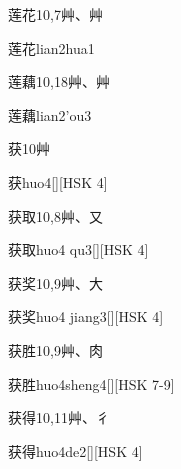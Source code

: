 \begin{Entry}{莲花}{10,7}{⾋、⾋}
  \begin{Phonetics}{莲花}{lian2hua1}
  \end{Phonetics}
\end{Entry}

\begin{Entry}{莲藕}{10,18}{⾋、⾋}
  \begin{Phonetics}{莲藕}{lian2'ou3}
  \end{Phonetics}
\end{Entry}

\begin{Entry}{获}{10}{⾋}
  \begin{Phonetics}{获}{huo4}[][HSK 4]
  \end{Phonetics}
\end{Entry}

\begin{Entry}{获取}{10,8}{⾋、⼜}
  \begin{Phonetics}{获取}{huo4 qu3}[][HSK 4]
  \end{Phonetics}
\end{Entry}

\begin{Entry}{获奖}{10,9}{⾋、⼤}
  \begin{Phonetics}{获奖}{huo4 jiang3}[][HSK 4]
  \end{Phonetics}
\end{Entry}

\begin{Entry}{获胜}{10,9}{⾋、⾁}
  \begin{Phonetics}{获胜}{huo4sheng4}[][HSK 7-9]
  \end{Phonetics}
\end{Entry}

\begin{Entry}{获得}{10,11}{⾋、⼻}
  \begin{Phonetics}{获得}{huo4de2}[][HSK 4]
  \end{Phonetics}
\end{Entry}

